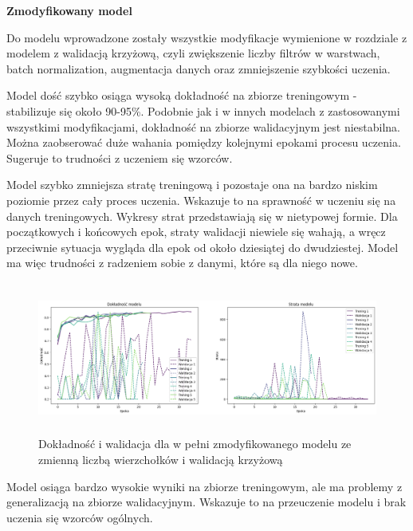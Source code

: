 \textbf{Zmodyfikowany model}

Do modelu wprowadzone zostały wszystkie modyfikacje wymienione w rozdziale z modelem z walidacją krzyżową,
czyli zwiększenie liczby filtrów w warstwach, batch normalization, augmentacja danych oraz zmniejszenie szybkości uczenia.

Model dość szybko osiąga wysoką dokładność na zbiorze treningowym - stabilizuje się około 90-95\%.
Podobnie jak i w innych modelach z zastosowanymi wszystkimi modyfikacjami,
dokładność na zbiorze walidacyjnym jest niestabilna.
Można zaobserować duże wahania pomiędzy kolejnymi epokami procesu uczenia.
Sugeruje to trudności z uczeniem się wzorców.

Model szybko zmniejsza stratę treningową i pozostaje ona na bardzo niskim poziomie przez cały proces uczenia.
Wskazuje to na sprawność w uczeniu się na danych treningowych.
Wykresy strat przedstawiają się w nietypowej formie.
Dla początkowych i końcowych epok, straty walidacji niewiele się wahają,
a wręcz przeciwnie sytuacja wygląda dla epok od około dziesiątej do dwudziestej.
Model ma więc trudności z radzeniem sobie z danymi, które są dla niego nowe.

\begin{figure}[ht]
	\centering
	\includegraphics[height=5cm]{resources/tests/images/v4/multiple_edges_crossvalid_img.png}
	\caption{Dokładność i walidacja dla w pełni zmodyfikowanego modelu ze zmienną liczbą wierzchołków i walidacją krzyżową}
	\label{Fig:tests-csvar-2a}
\end{figure}
\FloatBarrier

Model osiąga bardzo wysokie wyniki na zbiorze treningowym,
ale ma problemy z generalizacją na zbiorze walidacyjnym.
Wskazuje to na przeuczenie modelu i brak uczenia się wzorców ogólnych.

